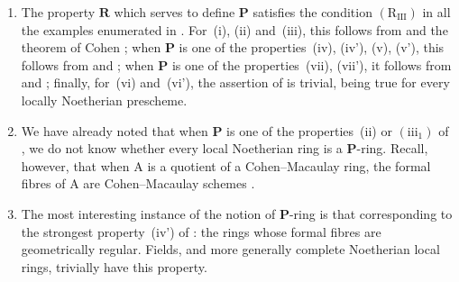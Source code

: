 \begin{remarks}[7.3.19]
\label{IV.7.3.19}
\begin{enumerate}[label=\emph{\roman*)}]
  \item The property $\boldsymbol{R}$ which serves to define $\boldsymbol{P}$ satisfies the condition $(\mathrm{R_{III}})$ in all the examples enumerated in .
  For~(i), (ii) and~(iii), this follows from  and the theorem of Cohen ; when $\boldsymbol{P}$ is one of the properties~(iv), (iv'), (v), (v'), this follows from  and ; when $\boldsymbol{P}$ is one of the properties~(vii), (vii'), it follows from  and ; finally, for~(vi) and~(vi'), the assertion of  is trivial, being true for every locally Noetherian prescheme.


  \item We have already noted  that when $\boldsymbol{P}$ is one of the properties~(ii) or $(\mathrm{iii}_1)$ of , we do not know whether every local Noetherian ring is a $\boldsymbol{P}$-ring.
  Recall, however, that when $\mathrm{A}$ is a quotient of a Cohen--Macaulay ring, the formal fibres of $\mathrm{A}$ are Cohen--Macaulay schemes .

  \item The most interesting instance of the notion of $\boldsymbol{P}$-ring is that corresponding to the strongest property~(iv') of : the rings whose formal fibres are geometrically regular.
  Fields, and more generally complete Noetherian local rings, trivially have this property.


\end{enumerate}
\end{remarks}
